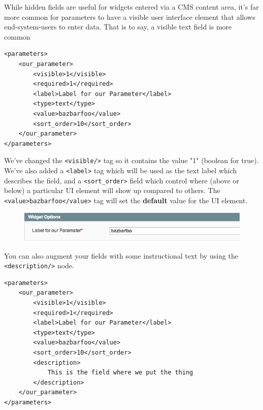 \documentclass[oneside]{book}
\begin{document}
While hidden fields are useful for widgets entered via a CMS content area, it's  far more common for parameters to have a visible user interface element that  allows end-system-users to enter data.  That is to say, a visible text field is more common

\begin{lstlisting}
<parameters>
    <our_parameter>
        <visible>1</visible>
        <required>1</required>
        <label>Label for our Parameter</label>
        <type>text</type>
        <value>bazbarfoo</value>
        <sort_order>10</sort_order>
    </our_parameter>
</parameters>

\end{lstlisting}


We've changed the \footnotesize\texttt{\textless visible/\textgreater } \normalsize  tag so it contains the value "1" (boolean for true).  We've also added a \footnotesize\texttt{\textless label\textgreater } \normalsize  tag which will be used as the text label which describes the field, and a \footnotesize\texttt{\textless sort\_order\textgreater } \normalsize  field which control where (above or below) a particular UI element will show up compared to others.  The \footnotesize\texttt{\textless value\textgreater bazbarfoo\textless /value\textgreater } \normalsize  tag will set the \textbf{default} value for the UI element.

\begin{figure}[htb]
\begin{center}
\leavevmode
\includegraphics[width=1\textwidth]{images/appendix_g/field.png}
\end{center}
\caption{}
\end{figure}


You can also augment your fields with some instructional text by using the \footnotesize\texttt{\textless description/\textgreater } \normalsize  node.

\begin{lstlisting}
<parameters>
    <our_parameter>
        <visible>1</visible>
        <required>1</required>
        <label>Label for our Parameter</label>
        <type>text</type>
        <value>bazbarfoo</value>
        <sort_order>10</sort_order>
        <description>
            This is the field where we put the thing
        </description>
    </our_parameter>
</parameters>

\end{lstlisting}
\end{document}
